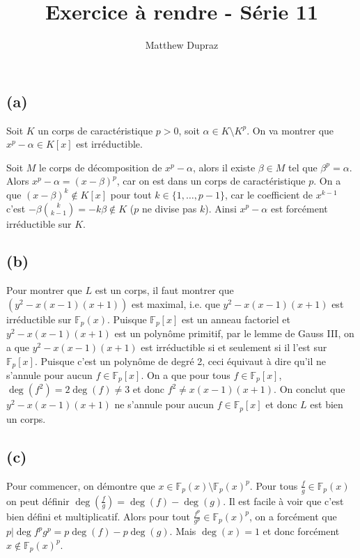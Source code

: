 \documentclass{article}
\author{Matthew Dupraz}
\title{Exercice à rendre - Série 11}
\newcommand{\F}{\mathbb{F}}
\begin{document}
\maketitle

\subsection*{(a)}

Soit $K$ un corps de caractéristique $p > 0$,
soit $\alpha \in K \setminus K^p$. On va montrer que
$x^p - \alpha \in K[x]$ est irréductible.

Soit $M$ le corps de décomposition de $x^p - \alpha$,
alors il existe $\beta \in M$ tel que $\beta^p = \alpha$.
Alors $x^p - \alpha = (x - \beta)^p$, car on est dans un corps de
caractéristique $p$. On a que $(x - \beta)^k \notin K[x]$ pour tout
$k \in \{1, \dots, p-1\}$, car le coefficient de $x^{k-1}$ c'est
$-\beta\binom{k}{k-1} = - k\beta \notin K$ ($p$ ne divise pas $k$).
Ainsi $x^p - \alpha$ est
forcément irréductible sur $K$.

\subsection*{(b)}

Pour montrer que $L$ est un corps, il faut montrer que
$(y^2 - x(x-1)(x+1))$ est maximal, i.e. que $y^2 - x(x-1)(x+1)$ est irréductible
sur $\F_p(x)$. Puisque $\F_p[x]$ est un anneau factoriel et
$y^2 - x(x-1)(x+1)$ est un polynôme primitif, par le lemme de Gauss III, 
on a que $y^2 - x(x-1)(x+1)$ est irréductible si et seulement si il l'est
sur $\F_p[x]$. Puisque c'est un polynôme de degré 2, ceci équivaut à dire
qu'il ne s'annule pour aucun $f \in \F_p[x]$.
On a que pour tous $f \in \F_p[x]$,
$\deg(f^2) = 2\deg(f) \neq 3$ et donc $f^2 \neq x(x-1)(x+1)$.
On conclut que $y^2 - x(x-1)(x+1)$ ne s'annule pour aucun $f \in \F_p[x]$ et
donc $L$ est bien un corps.

\subsection*{(c)}

Pour commencer, on démontre que $x \in \F_p(x) \setminus \F_p(x)^p$.
Pour tous $\frac{f}{g} \in \F_p(x)$ on peut définir
$\deg(\frac{f}{g}) = \deg(f) - \deg(g)$. Il est facile à voir que c'est bien
défini et multiplicatif. Alors pour tout $\frac{f^p}{g^p} \in \F_p(x)^p$, 
on a forcément que $p | \deg{f^p}{g^p} = p\deg(f) - p\deg(g)$.
Mais $\deg(x) = 1$ et donc forcément $x \notin \F_p(x)^p$.
\end{document}
